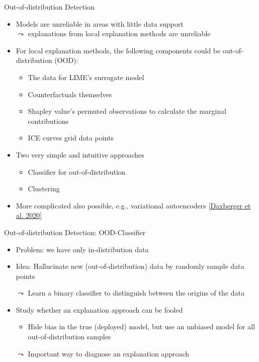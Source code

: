 \documentclass[11pt,compress,t,notes=noshow, aspectratio=169, xcolor=table]{beamer}
\begin{document}
\begin{frame}[c]{Out-of-distribution Detection}
	\begin{itemize}
		\item Models are unreliable in areas with little data support\\ $\leadsto$ explanations from local explanation methods are unreliable
		\pause
		\item For local explanation methods, the following components could be out-of-distribution (OOD): 
		\begin{itemize}
			\item The data for LIME's surrogate model
			\item Counterfactuals themselves
			\item Shapley value's permuted observations to calculate the marginal contributions 
			\item ICE curves grid data points 
		\end{itemize}
		\pause
		\item Two very simple and intuitive approaches
		\begin{itemize}
		    \item Classifier for out-of-distribution
		    \item Clustering
		\end{itemize}
		\item More complicated also possible, e.g., variational autoencoders [\href{https://arxiv.org/abs/1912.05651}{Daxberger et al. 2020}]
	\end{itemize}
\end{frame}


\begin{frame}[c]{Out-of-distribution Detection: OOD-Classifier}
	\begin{itemize}
	    \item Problem: we have only in-distribution data
	    \item Idea: Hallucinate new (out-of-distribution) data by randomly sample data points
	    \item[$\leadsto$] Learn a binary classifier to distinguish between the origins of the data
	    \medskip
	    \pause
	    \item Study whether an explanation approach can be fooled 
	    \begin{itemize}
	        \item Hide bias in the true (deployed) model, but use an unbiased model for all out-of-distribution samples
	    \end{itemize}
	    \item[$\leadsto$] Important way to diagnose an explanation approach
	\end{itemize}
\end{frame}
\end{document}
